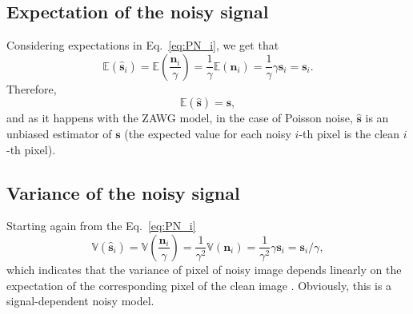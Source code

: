 \subsection{Expectation of the noisy signal}
Considering expectations in Eq.~\ref{eq:PN_i}, we get that
\begin{equation}
  \mathbb{E}(\hat{\mathbf{s}}_i) = \mathbb{E}\left(\frac{\mathbf{n}_i}{\gamma}\right) = \frac{1}{\gamma}\mathbb{E}(\mathbf{n}_i) = \frac{1}{\gamma}\gamma\mathbf{s}_i = \mathbf{s}_i.
  \label{eq:EPNi}
\end{equation}
Therefore,
\begin{equation}
  \mathbb{E}(\hat{\mathbf{s}}) = \mathbf{s},
  \label{eq:E_Poisson}
\end{equation}
and as it happens with the \gls{ZAWG} model, in the case of Poisson
noise, $\hat{\mathbf{s}}$ is an unbiased estimator of $\mathbf{s}$
(the expected value for each noisy $i$-th pixel is the clean $i$-th
pixel).

\subsection{Variance of the noisy signal}
Starting again from the Eq.~\ref{eq:PN_i}
\begin{equation}
  \mathbb{V}(\hat{\mathbf{s}}_i) = \mathbb{V}\left(\frac{\mathbf{n}_i}{\gamma}\right) = \frac{1}{\gamma^2}\mathbb{V}(\mathbf{n}_i) = \frac{1}{\gamma^2}\gamma\mathbf{s}_i = \mathbf{s}_i/\gamma,
  \label{eq:V_Poisson}
\end{equation}
which indicates that the variance of pixel of noisy image depends
linearly on the expectation of the corresponding pixel of the clean
image \cite{foi2008practical}. Obviously, this is a signal-dependent
noisy model.

\begin{comment}
In the exteme case where $\mathbf{s}=\mathbf{0}$, we get that
\begin{equation}
  \mathbb{E}(\hat{\mathbf{s}}) = 0,
\end{equation}
and
\begin{equation}
  \mathbb{V}(\hat{\mathbf{s}}) = 0.
\end{equation}
If $\mathbf{s}=\mathbf{1}$, then
\begin{equation}
  \mathbb{E}(\hat{\mathbf{s}}) = 1,
\end{equation}
and
\begin{equation}
  \mathbb{V}(\hat{\mathbf{s}}) = 1/\gamma.
\end{equation}
\end{comment}

